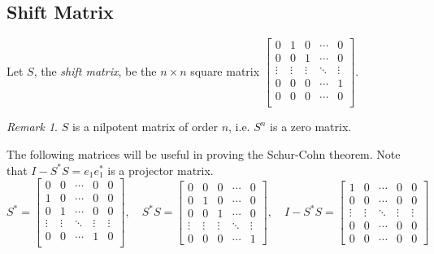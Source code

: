 \documentclass[twoside]{article}
\newcommand*\adj[1]{#1^*}
\newcommand*\norm[1]{\left \Vert #1 \right\Vert}
\theoremstyle{plain}
\theoremstyle{definition}
\theoremstyle{remark}
\newtheorem*{remark}{Remark}
\begin{document}
\subsection{Shift Matrix}
Let \(S\), the {\em shift matrix},  be the \(n \times n\) square matrix \( \begin{bmatrix} 
0 & 1 & 0 & \cdots & 0 \\
0 & 0 & 1 & \cdots & 0 \\
\vdots & \vdots & \vdots &\ddots & \vdots \\
0 & 0 & 0 &\cdots & 1 \\
0 & 0 & 0 & \cdots & 0 \\ 
\end{bmatrix}\). 

 \begin{remark} \(S\) is a nilpotent matrix of order \(n\), i.e. \(S^n\) is a zero matrix. \end{remark}


The following matrices will be useful in proving the Schur-Cohn theorem. Note that \(I - \adj{S} S = e_1 \adj{e_1}\) is a projector matrix.
\[\adj{S} =  \begin{bmatrix} 
0 & 0 & \cdots & 0 & 0 \\
1 & 0 & \cdots & 0 & 0 \\
0 & 1 & \cdots & 0 & 0 \\
\vdots & \vdots & \ddots &\vdots & \vdots \\
0 & 0 & \cdots & 1 & 0 \\ 
\end{bmatrix}, \quad 
\adj{S} S  =  \begin{bmatrix} 
0 & 0 & 0 & \cdots & 0 \\
0 & 1 & 0 & \cdots & 0 \\
0 & 0 & 1 & \cdots & 0 \\
\vdots & \vdots & \vdots & \ddots & \vdots \\
0 & 0 & 0 & \cdots & 1
\end{bmatrix}, \quad 
 I - \adj{S} S =  \begin{bmatrix} 
1 & 0 & \cdots & 0 & 0 \\
0 & 0 & \cdots & 0 & 0 \\
\vdots & \vdots & \ddots &\vdots & \vdots \\
0 & 0 & \cdots & 0 & 0 \\ 
0 & 0 & \cdots & 0 & 0
\end{bmatrix}\]
\end{document}
